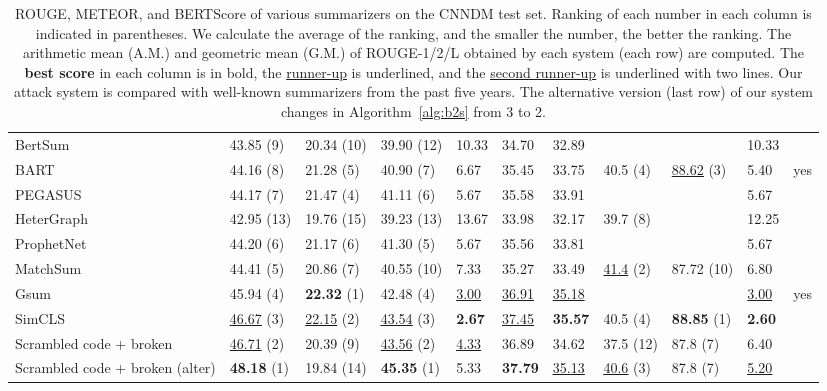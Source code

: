 \documentclass[11pt]{article}
\theoremstyle{remark}
\begin{document}
\begin{landscape}
\begin{table}[t]
\begin{tabularx}{\linewidth}{Xllllllllll}
BertSum                        ~\citealp{liu-lapata-2019-text} & 43.85 (9) & 20.34 (10) & 39.90 (12) & 10.33 & 34.70 & 32.89 &          &           & 10.33 &     \\
BART                           ~\citealp{lewis-etal-2020-bart} & 44.16 (8) & 21.28 (5) & 40.90 (7) & 6.67  & 35.45 & 33.75 & 40.5 (4) & \underline{\underline{88.62}} (3) & 5.40  & yes \\
PEGASUS                        ~\citealp{zhang2020pegasus} & 44.17 (7) & 21.47 (4) & 41.11 (6) & 5.67  & 35.58 & 33.91 &          &           & 5.67  &     \\
HeterGraph                     ~\citealp{wang-etal-2020-heterogeneous} & 42.95 (13) & 19.76 (15) & 39.23 (13) & 13.67 & 33.98 & 32.17 & 39.7 (8) &           & 12.25 &     \\
ProphetNet                     ~\citealp{qi-etal-2020-prophetnet} & 44.20 (6) & 21.17 (6) & 41.30 (5) & 5.67  & 35.56 & 33.81 &          &           & 5.67  &     \\
MatchSum                       ~\citealp{zhong-etal-2020-extractive} & 44.41 (5) & 20.86 (7) & 40.55 (10) & 7.33  & 35.27 & 33.49 & \underline{41.4} (2) & 87.72 (10) & 6.80  &     \\
Gsum                           ~\citealp{dou-etal-2021-gsum} & 45.94 (4) & \textbf{22.32} (1) & 42.48 (4) & \underline{3.00}  & \underline{\underline{36.91}} & \underline{35.18} &          &           & \underline{3.00}  & yes \\
SimCLS                         ~\citealp{liu-liu-2021-simcls} & \underline{\underline{46.67}} (3) & \underline{22.15} (2) & \underline{\underline{43.54}} (3) & \textbf{2.67}  & \underline{37.45} & \textbf{35.57} & 40.5 (4) & \textbf{88.85} (1) & \textbf{2.60}  &     \\
\hline
Scrambled code + broken                        & \underline{46.71} (2) & 20.39 (9) & \underline{43.56} (2) & \underline{\underline{4.33}}  & 36.89 & 34.62 & 37.5 (12) & 87.8  (7) & 6.40  &     \\
Scrambled code + broken (alter)                     & \textbf{48.18} (1) & 19.84 (14) & \textbf{45.35} (1) & 5.33  & \textbf{37.79} & \underline{\underline{35.13}} & \underline{\underline{40.6}} (3) & 87.8  (7) & \underline{\underline{5.20}}  &    
           \\
\hline
\end{tabularx}
\caption{ROUGE, METEOR, and BERTScore of various summarizers on the CNNDM test set. Ranking of each number in each column is indicated in parentheses. We calculate the average of the ranking, and the smaller the number, the better the ranking. The arithmetic mean (A.M.) and geometric mean (G.M.) of ROUGE-1/2/L obtained by each system (each row) are computed. The \textbf{best score} in each column is in bold, the \underline{runner-up} is underlined, and the \underline{\underline{second runner-up}} is underlined with two lines. Our attack system is compared with well-known summarizers from the past five years. The alternative version (last row) of our system changes  in Algorithm~\ref{alg:b2s} from 3 to 2.}
\label{tab:additional}
\end{table}
\end{landscape}
 
\end{document}

